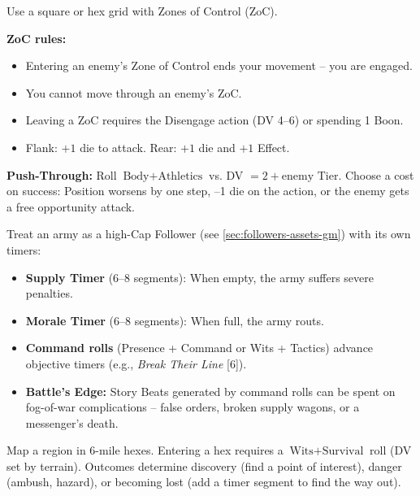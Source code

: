 \begin{tcolorbox}[title=Grid-Based Combat (Optional), colback=white!97!gray, colframe=black!80!gray,breakable]
Use a square or hex grid with Zones of Control (ZoC).

\textbf{ZoC rules:}
\begin{itemize}
  \item Entering an enemy's Zone of Control ends your movement -- you are engaged.
  \item You cannot move through an enemy's ZoC.
  \item Leaving a ZoC requires the Disengage action (DV 4--6) or spending 1 Boon.
  \item Flank: \(+1\) die to attack. Rear: \(+1\) die and \(+1\) Effect.
\end{itemize}
\textbf{Push-Through:} Roll $\text{Body}+\text{Athletics}$ vs. DV $= 2 + \text{enemy Tier}$. Choose a cost on success: Position worsens by one step, --1 die on the action, or the enemy gets a free opportunity attack.
\end{tcolorbox}

\begin{tcolorbox}[title=Detailed Warfare (Mass Combat), colback=white!97!gray, colframe=black!80!gray,breakable]
Treat an army as a high-Cap Follower (see \ref{sec:followers-assets-gm}) with its own timers:
\begin{itemize}
  \item \textbf{Supply Timer } (6--8 segments): When empty, the army suffers severe penalties.
  \item \textbf{Morale Timer } (6--8 segments): When full, the army routs.
  \item \textbf{Command rolls} (Presence + Command or Wits + Tactics) advance objective timers (e.g., \emph{Break Their Line} [6]).
  \item \textbf{Battle's Edge:} Story Beats generated by command rolls can be spent on fog-of-war complications -- false orders, broken supply wagons, or a messenger's death.
\end{itemize}
\end{tcolorbox}

\begin{tcolorbox}[title=Hex-Based Exploration, colback=white!97!gray, colframe=black!80!gray,breakable]
Map a region in 6-mile hexes. Entering a hex requires a $\text{Wits}+\text{Survival}$ roll (DV set by terrain). Outcomes determine discovery (find a point of interest), danger (ambush, hazard), or becoming lost (add a timer segment to find the way out).
\end{tcolorbox}

